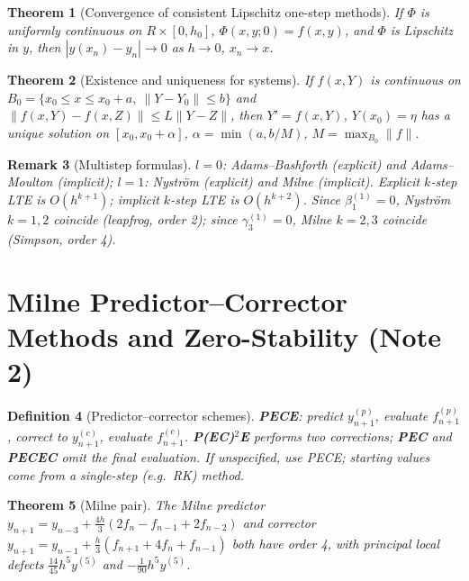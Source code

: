 \documentclass[10pt,a4paper]{article}
\theoremstyle{tight}
\newtheorem{theorem}{Theorem}[section]
\newtheorem{definition}[theorem]{Definition}
\newtheorem{remark}[theorem]{Remark}
\begin{document}
\begin{theorem}[Convergence of consistent Lipschitz one-step methods]
If \(\Phi\) is uniformly continuous on \(R\times[0,h_0]\), \(\Phi(x,y;0)=f(x,y)\), and \(\Phi\) is
Lipschitz in \(y\), then \(|y(x_n)-y_n|\to0\) as \(h\to0\), \(x_n\to x\).
\end{theorem}

\begin{theorem}[Existence and uniqueness for systems]
If \(f(x,Y)\) is continuous on \(B_0=\{x_0\le x\le x_0+a,\ \|Y-Y_0\|\le b\}\) and
\(\|f(x,Y)-f(x,Z)\|\le L\|Y-Z\|\), then \(Y'=f(x,Y)\), \(Y(x_0)=\eta\) has a unique solution on
\([x_0,x_0+\alpha]\), \(\alpha=\min(a,b/M)\), \(M=\max_{B_0}\|f\|\).
\end{theorem}

\begin{remark}[Multistep formulas]
\(l=0\): Adams--Bashforth (explicit) and Adams--Moulton (implicit); \(l=1\): Nystr\"om (explicit) and
Milne (implicit). Explicit \(k\)-step LTE is \(O(h^{k+1})\); implicit \(k\)-step LTE is \(O(h^{k+2})\).
Since \(\beta_1^{(1)}=0\), Nystr\"om \(k=1,2\) coincide (leapfrog, order 2); since \(\gamma_3^{(1)}=0\),
Milne \(k=2,3\) coincide (Simpson, order 4).
\end{remark}

\section{Milne Predictor--Corrector Methods and Zero-Stability (Note 2)}

\begin{definition}[Predictor--corrector schemes]
\textbf{PECE}: predict \(y^{(p)}_{n+1}\), evaluate \(f^{(p)}_{n+1}\), correct to \(y^{(c)}_{n+1}\),
evaluate \(f^{(c)}_{n+1}\). \textbf{P(EC)\(^2\)E} performs two corrections; \textbf{PEC} and
\textbf{PECEC} omit the final evaluation. If unspecified, use PECE; starting values come from a
single-step (e.g.\ RK) method.
\end{definition}

\begin{theorem}[Milne pair]
The Milne predictor \(y_{n+1}=y_{n-3}+\frac{4h}3(2f_n-f_{n-1}+2f_{n-2})\) and corrector
\(y_{n+1}=y_{n-1}+\frac h3(f_{n+1}+4f_n+f_{n-1})\) both have order 4, with principal local defects
\(\frac{14}{45}h^5y^{(5)}\) and \(-\frac1{90}h^5y^{(5)}\).
\end{theorem}
\end{document}
